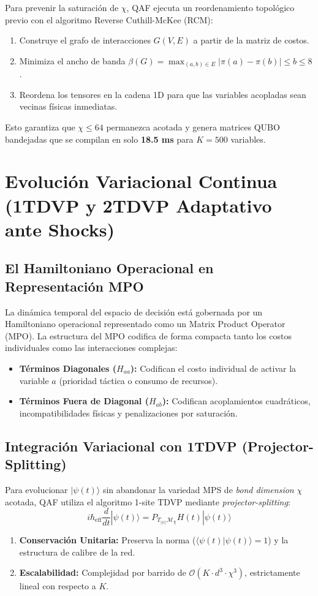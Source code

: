 \documentclass[11pt,a4paper,oneside]{report}
\begin{document}
Para prevenir la saturación de $\chi$, QAF ejecuta un reordenamiento topológico previo con el algoritmo Reverse Cuthill-McKee (RCM):
\begin{enumerate}
    \item Construye el grafo de interacciones $G(V, E)$ a partir de la matriz de costos.
    \item Minimiza el ancho de banda $\beta(G) = \max_{(a,b) \in E} |\pi(a) - \pi(b)| \le b \le 8$.
    \item Reordena los tensores en la cadena 1D para que las variables acopladas sean vecinas físicas inmediatas.
\end{enumerate}
Esto garantiza que $\chi \le 64$ permanezca acotada y genera matrices QUBO bandejadas que se compilan en solo \textbf{18.5 ms} para $K = 500$ variables.


\chapter{Evolución Variacional Continua (1TDVP y 2TDVP Adaptativo ante Shocks)}
\label{cap:tdvp_dinamica}

\section{El Hamiltoniano Operacional en Representación MPO}
La dinámica temporal del espacio de decisión está gobernada por un Hamiltoniano operacional representado como un Matrix Product Operator (MPO). La estructura del MPO codifica de forma compacta tanto los costos individuales como las interacciones complejas:
\begin{itemize}
    \item \textbf{Términos Diagonales ($H_{aa}$):} Codifican el costo individual de activar la variable $a$ (prioridad táctica o consumo de recursos).
    \item \textbf{Términos Fuera de Diagonal ($H_{ab}$):} Codifican acoplamientos cuadráticos, incompatibilidades físicas y penalizaciones por saturación.
\end{itemize}

\section{Integración Variacional con 1TDVP (Projector-Splitting)}
Para evolucionar $|\psi(t)\rangle$ sin abandonar la variedad MPS de \emph{bond dimension} $\chi$ acotada, QAF utiliza el algoritmo 1-site TDVP mediante \emph{projector-splitting}:
\begin{equation}
i\hbar_{\text{eff}} \frac{d}{dt} |\psi(t)\rangle = P_{T_{|\psi\rangle} \mathcal{M}_\chi} H(t) |\psi(t)\rangle
\end{equation}
\begin{enumerate}
    \item \textbf{Conservación Unitaria:} Preserva la norma ($\langle\psi(t)|\psi(t)\rangle = 1$) y la estructura de calibre de la red.
    \item \textbf{Escalabilidad:} Complejidad por barrido de $\mathcal{O}(K \cdot d^3 \cdot \chi^3)$, estrictamente lineal con respecto a $K$.
\end{enumerate}
\end{document}
